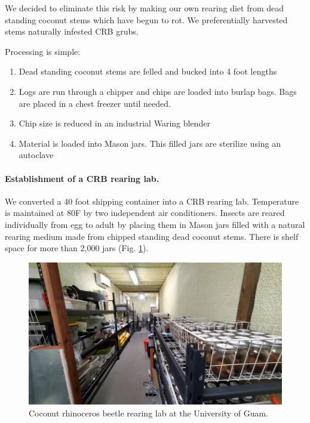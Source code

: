 \documentclass[12pt,letterpaper,english,bibliography=totocnumbered, abstract=on]{scrartcl}
\begin{document}
We decided to eliminate this risk by making our own rearing diet from dead standing coconut stems which have begun to rot. We preferentially harvested stems naturally infested CRB grubs.

Processing is simple:
\begin{enumerate}
	\item Dead standing coconut stems are felled and bucked into 4 foot lengths
	\item Logs are run through a chipper and chips are loaded into burlap bags. Bags are placed in a chest freezer until needed.
	\item Chip size is reduced in an industrial Waring blender
	\item Material is loaded into Mason jars. This filled jars are sterilize using an autoclave
\end{enumerate}

\paragraph{Establishment of a CRB rearing lab.}

We converted a 40 foot shipping container into a CRB rearing lab. Temperature is maintained at 80\degree F by two independent air conditioners. Insects are reared individually from egg to adult by placing them in Mason jars filled with a natural rearing medium made from chipped standing dead coconut stems. There is shelf space for more than 2,000 jars (Fig. \ref{fig:rearing-lab}).

\begin{figure}[h]
	\centering
	\includegraphics[width=\linewidth]{images/rearing-lab}
	\caption{Coconut rhinoceros beetle rearing lab at the University of Guam.}
	\label{fig:rearing-lab}
\end{figure}
\end{document}
